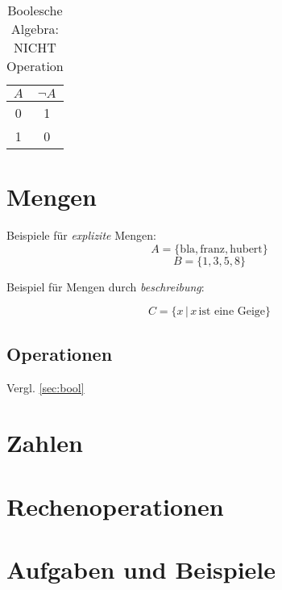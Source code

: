 \begin{table}[h!]
    \centering
    \begin{tabular}{|c|c|}
        \hline
        $A$ & $\neg A$ \\
        \hline
        0 & 1 \\
        1 & 0 \\
        \hline
    \end{tabular}
    \caption{Boolesche Algebra: NICHT Operation}
\end{table}


\section{Mengen}


Beispiele für \emph{explizite} Mengen:
$$ A = \{ \text{bla}, \text{franz}, \text{hubert} \} $$ 
$$ B = \{ 1, 3, 5, 8 \} $$ 

Beispiel für Mengen durch \emph{beschreibung}:

$$ C = \{x \, | \, x \, \text{ist eine Geige} \} $$

\subsection{Operationen}
Vergl. \ref{sec:bool}



\section{Zahlen}

\section{Rechenoperationen}



\section{Aufgaben und Beispiele}
